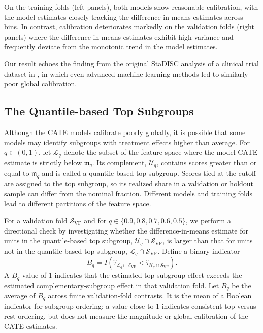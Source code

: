 \documentclass[12pt]{article}
\begin{document}
On the training folds (left panels), both models show reasonable calibration, with the model estimates closely tracking the difference-in-means estimates across bins. In contrast, calibration deteriorates markedly on the validation folds (right panels) where the difference-in-means estimates exhibit high variance and frequently deviate from the monotonic trend in the model estimates.

Our result echoes the finding from the original StaDISC analysis of a clinical trial dataset in \cite{dwivedi2020}, in which even advanced machine learning methods led to similarly poor global calibration.

\begingroup{}


\endgroup

\subsection{The Quantile-based Top Subgroups}

Although the CATE models calibrate poorly globally, it is possible that some models may identify subgroups with treatment effects higher than average. For $q\in (0,1)$, let $\mathcal{L}_q$ denote the subset of the feature space where the model CATE estimate is strictly below $\mathfrak{m}_{q}$. Its complement, $\mathcal{U}_q$, contains scores greater than or equal to $\mathfrak{m}_{q}$ and is called a quantile-based top subgroup. Scores tied at the cutoff are assigned to the top subgroup, so its realized share in a validation or holdout sample can differ from the nominal fraction. Different models and training folds lead to different partitions of the feature space.

For a validation fold $\mathcal{S}_{\text{VF}}$ and for $q \in \{0.9,0.8,0.7,0.6,0.5\}$, we perform a directional check by investigating whether the difference-in-means estimate for units in the quantile-based top subgroup, $\mathcal{U}_q \cap \mathcal{S}_{\text{VF}}$, is larger than that for units not in the quantile-based top subgroup, $\mathcal{L}_q \cap \mathcal{S}_{\text{VF}}$. Define a binary indicator
\begin{equation*}
B_q = I\left(\widehat{\tau}_{\mathcal{L}_q \cap \mathcal{S}_{\text{VF}}}<  \widehat{\tau}_{\mathcal{U}_q \cap \mathcal{S}_{\text{VF}}}\right).
\end{equation*}
A $B_q$ value of 1 indicates that the estimated top-subgroup effect exceeds the estimated complementary-subgroup effect in that validation fold. Let $\bar{B}_q$ be the average of $B_q$ across finite validation-fold contrasts. It is the mean of a Boolean indicator for subgroup ordering: a value close to 1 indicates consistent top-versus-rest ordering, but does not measure the magnitude or global calibration of the CATE estimates.
\end{document}
